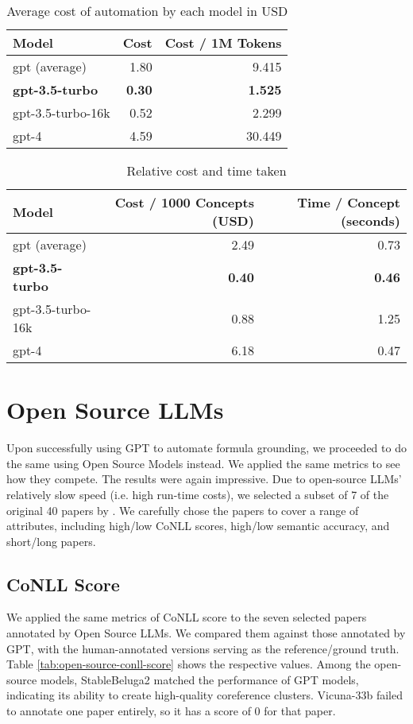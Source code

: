 \begin{table}[htpb]
  \centering
  \begin{tabular}{lrr}
    \hline
    Model & Cost & Cost / 1M Tokens \\
    \hline
    gpt (average) & 1.80 & 9.415 \\
    \textbf{gpt-3.5-turbo} & \textbf{0.30} & \textbf{1.525} \\
    gpt-3.5-turbo-16k & 0.52 & 2.299 \\
    gpt-4 & 4.59 & 30.449 \\
    \hline
  \end{tabular}
  \caption[Cost Analysis]{Average cost of automation by each model in USD}
  \label{tab:cost}
\end{table}

\begin{table}[htpb]
  \centering
  \begin{tabular}{lrr}
    \hline
    Model & Cost / 1000 Concepts (USD) & Time / Concept (seconds) \\
    \hline
    gpt (average) & 2.49 & 0.73\\
    \textbf{gpt-3.5-turbo} & \textbf{0.40} & \textbf{0.46} \\
    gpt-3.5-turbo-16k & 0.88 & 1.25 \\
    gpt-4 & 6.18 & 0.47 \\
    \hline
  \end{tabular}
  \caption[Cost Analysis]{Relative cost and time taken}
  \label{tab:relative-cost}
\end{table}


\section{Open Source LLMs}
Upon successfully using GPT to automate formula grounding, we proceeded to do the same using Open Source Models instead. We applied the same metrics to see how they compete. The results were again impressive. Due to open-source LLMs' relatively slow speed (i.e. high run-time costs), we selected a subset of 7 of the original 40 papers by \citet{asakura2022building}. We carefully chose the papers to cover a range of attributes, including high/low CoNLL scores, high/low semantic accuracy, and short/long papers.

\subsection{CoNLL Score}
We applied the same metrics of CoNLL score to the seven selected papers annotated by Open Source LLMs. We compared them against those annotated by GPT, with the human-annotated versions serving as the reference/ground truth. Table \ref{tab:open-source-conll-score} shows the respective values. Among the open-source models, StableBeluga2 matched the performance of GPT models, indicating its ability to create high-quality coreference clusters. Vicuna-33b failed to annotate one paper entirely, so it has a score of 0 for that paper.

